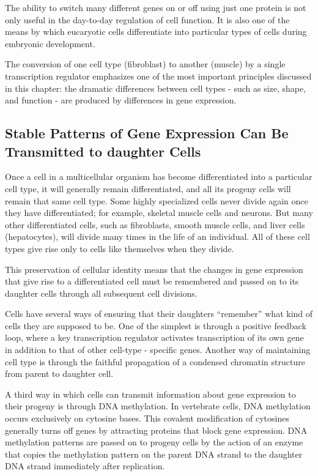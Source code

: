 The ability to switch many different genes on or off using just one protein
is not only useful in the day-to-day regulation of cell function. It is also
one of the means by which eucaryotic cells differentiate into particular
types of cells during embryonic development.

The conversion of one cell type (fibroblast) to another (muscle) by a single
transcription regulator emphasizes one of the most important principles
discussed in this chapter: the dramatic differences between cell types - 
such as size, shape, and function - are produced by differences in gene
expression.

\subsection{Stable Patterns of Gene Expression Can Be Transmitted to daughter Cells}

Once a cell in a multicellular organism has become differentiated into a particular cell type, it will generally
remain differentiated, and all its progeny cells will remain that same cell
type. Some highly specialized cells never divide again once they have
differentiated; for example, skeletal muscle cells and neurons. But many
other differentiated cells, such as fibroblasts, smooth muscle cells, and
liver cells (hepatocytes), will divide many times in the life of an individual. 
All of these cell types give rise only to cells like themselves when
they divide.

This preservation of cellular identity means that the changes in gene
expression that give rise to a differentiated cell must be remembered and
passed on to its daughter cells through all subsequent cell divisions.

Cells have several ways of ensuring that their daughters “remember”
what kind of cells they are supposed to be. One of the simplest is through
a positive feedback loop, where a key transcription regulator activates
transcription of its own gene in addition to that of other cell-type - specific
genes. Another way of maintaining cell type is through
the faithful propagation of a condensed chromatin structure from parent
to daughter cell.

A third way in which cells can transmit information about gene expression 
to their progeny is through DNA methylation. In vertebrate cells,
DNA methylation occurs exclusively on cytosine bases. This
covalent modification of cytosines generally turns off genes by attracting 
proteins that block gene expression. DNA methylation patterns are
passed on to progeny cells by the action of an enzyme that copies the
methylation pattern on the parent DNA strand to the daughter DNA strand
immediately after replication.

